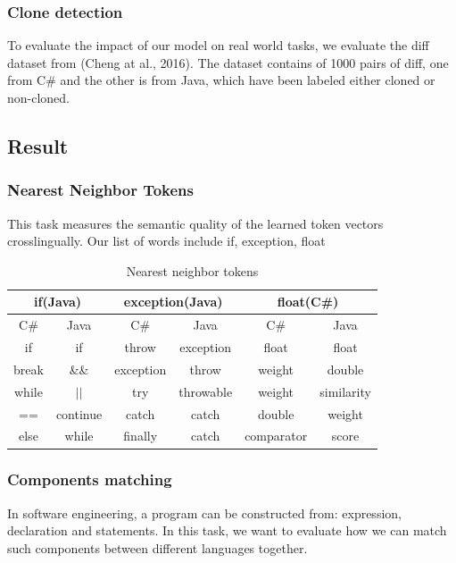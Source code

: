 \subsubsection{Clone detection}
To evaluate the impact of our model on real world tasks, we evaluate the diff dataset from (Cheng at al., 2016). The dataset contains of 1000 pairs of diff, one from C\# and the other is from Java, which have been labeled either cloned or non-cloned. 

\subsection{Result}
\subsubsection{Nearest Neighbor Tokens}
This task measures the semantic quality of the learned token vectors crosslingually. Our list of words include {if, exception, float}
\begin{table}
	\caption{Nearest neighbor tokens}
	\label{tab:freq}
	
	\begin{tabular}{cccccc}
		
		\hline
		\multicolumn{2}{c}{if(Java)}  & \multicolumn{2}{c}{exception(Java)} & \multicolumn{2}{c}{float(C\#)} \\
		\hline
		 C\# & Java & C\# & Java & C\# & Java \\
		\hline
		 if & if & throw & exception & float & float \\
		 break & \&\& & exception & throw & weight & double \\
		 while &  $||$ & try & throwable & weight & similarity \\
		 == & continue & catch & catch & double & weight \\
		 else & while & finally & catch & comparator & score\\
	
		\hline
	\end{tabular}
\end{table}
\subsubsection{Components matching}
In software engineering, a program can be constructed from: expression, declaration and statements. In this task, we want to evaluate how we can match such components between different languages together.


